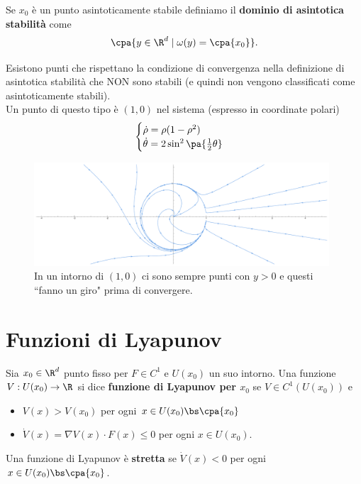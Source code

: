 \begin{definition}
Se $x_0$ \`e un punto asintoticamente stabile definiamo il \textbf{dominio di asintotica stabilit\`a} come
\[\cpa{y\in\R^d\mid \omega(y)=\cpa{x_0}}.\]
\end{definition}

\begin{remark}
Esistono punti che rispettano la condizione di convergenza nella definizione di asintotica stabilit\`a che NON sono stabili (e quindi non vengono classificati come asintoticamente stabili).\\
Un punto di questo tipo \`e $(1,0)$ nel sistema (espresso in coordinate polari)
\[\begin{cases}
\dot\rho=\rho(1-\rho^2)\\
\dot\theta=2\sin^2\pa{\frac12\theta}
\end{cases}\]
\begin{figure}[!htb]
    \centering
    \includegraphics[width=11cm]{Immagini/convergenza_non_asintoticamente_stabile.pdf}
    \caption{In un intorno di $(1,0)$ ci sono sempre punti con $y>0$ e questi ``fanno un giro" prima di convergere.}
\end{figure}
\end{remark}

\section{Funzioni di Lyapunov}
\begin{definition}
Sia $x_0\in\R^d$ punto fisso per $F\in C^1$ e $U(x_0)$ un suo intorno. Una funzione $V:U(x_0)\to\R$ si dice \textbf{funzione di Lyapunov per $x_0$} se $V\in C^1(U(x_0))$ e
\setlength{\leftmargini}{0.5cm}
\begin{itemize}
\item $V(x)>V(x_0)$ per ogni $x\in U(x_0)\bs \cpa{x_0}$
\item $\dot V(x)=\nabla V(x)\cdot F(x)\leq 0$ per ogni $x\in U(x_0)$.
\end{itemize}
Una funzione di Lyapunov \`e \textbf{stretta} se $\dot V(x)<0$ per ogni $x\in U(x_0)\bs \cpa{x_0}$.
\end{definition}

